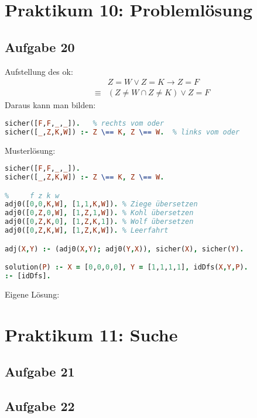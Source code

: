 \documentclass{scrreprt}
\begin{document}
\chapter{Praktikum 10: Problemlösung}
\section{Aufgabe 20}
Aufstellung des ok:
\begin{align*}
&Z=W \vee Z=K \to Z=F\\
\equiv& (Z \not = W \cap Z \not = K) \vee Z=F
\end{align*}
Daraus kann man bilden:
\begin{lstlisting}[language=Prolog]
sicher([F,F,_,_]).	 % rechts vom oder
sicher([_,Z,K,W]) :- Z \== K, Z \== W.	% links vom oder
\end{lstlisting}
Musterlösung:
\begin{lstlisting}[language=Prolog]
%				f z k w
sicher([F,F,_,_]).
sicher([_,Z,K,W]) :- Z \== K, Z \== W.

%     f z k w
adj0([0,0,K,W], [1,1,K,W]).	% Ziege übersetzen
adj0([0,Z,0,W], [1,Z,1,W]).	% Kohl übersetzen
adj0([0,Z,K,0], [1,Z,K,1]).	% Wolf übersetzen
adj0([0,Z,K,W], [1,Z,K,W]).	% Leerfahrt

adj(X,Y) :- (adj0(X,Y); adj0(Y,X)), sicher(X), sicher(Y).

solution(P) :- X = [0,0,0,0], Y = [1,1,1,1], idDfs(X,Y,P).
:- [idDfs].
\end{lstlisting}
Eigene Lösung:


\chapter{Praktikum 11: Suche}
\section{Aufgabe 21}


\section{Aufgabe 22}
\end{document}
